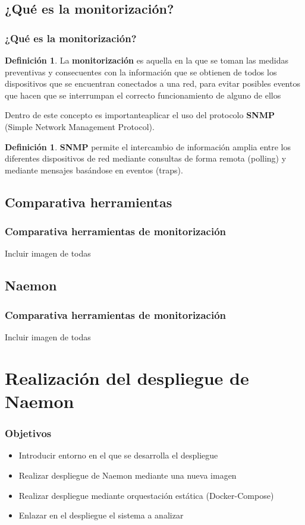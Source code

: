 \documentclass{beamer}
\theoremstyle{plain}
\theoremstyle{definition}
\newtheorem{defn}[thm]{Definici\'{o}n}
\theoremstyle{plain}
\theoremstyle{definition}
\theoremstyle{remark}
\theoremstyle{definition}
\begin{document}
\subsection{¿Qué es la monitorización?}
\begin{frame}
	\frametitle{¿Qué es la monitorización?}
	\begin{defn}
		La \textbf{monitorización} es aquella en la que se toman las medidas preventivas y
		consecuentes con la información que se obtienen de todos los dispositivos
		que se encuentran conectados a una red, para evitar posibles eventos que
		hacen que se interrumpan el correcto funcionamiento de alguno de ellos
	\end{defn}
Dentro de este concepto es importanteaplicar el uso del protocolo \textbf{SNMP} (Simple Network
Management Protocol).
\begin{defn}
	\textbf{SNMP} permite el intercambio de información amplia entre los diferentes dispositivos de red mediante consultas de forma remota (polling) y mediante mensajes basándose en eventos (traps).
\end{defn}

	
\end{frame}

\subsection{Comparativa herramientas}
\begin{frame}
	\frametitle{Comparativa herramientas de monitorización}
	Incluir imagen de todas	
\end{frame}

\subsection{Naemon}
\begin{frame}
	\frametitle{Comparativa herramientas de monitorización}
	Incluir imagen de todas	
\end{frame}


\section{Realización del despliegue de Naemon} %
\begin{frame}
	
	\frametitle{Objetivos}
	\begin{itemize}
		\item Introducir entorno en el que se desarrolla el despliegue
		\item Realizar despliegue de Naemon mediante una nueva imagen
		\item Realizar despliegue mediante orquestación estática (Docker-Compose)
		\item Enlazar en el despliegue el sistema a analizar
	\end{itemize}
	
\end{frame}
\end{document}
